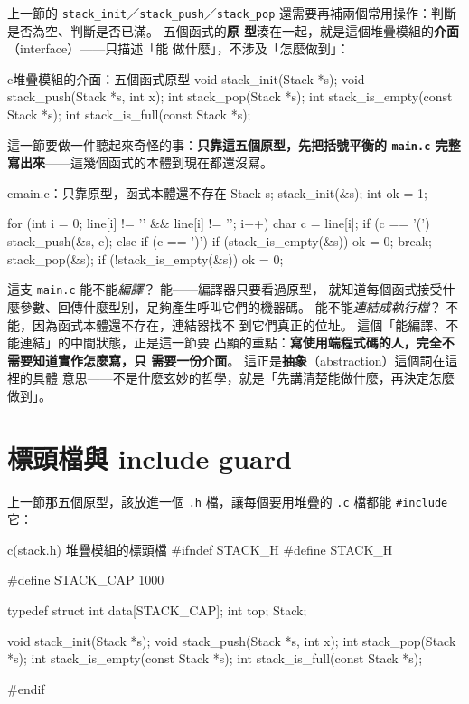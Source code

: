 上一節的 \texttt{stack\_init}／\texttt{stack\_push}／\texttt{stack\_pop}
還需要再補兩個常用操作：判斷是否為空、判斷是否已滿。 五個函式的\textbf{原
型}湊在一起，就是這個堆疊模組的\textbf{介面}（interface）——只描述「能
做什麼」，不涉及「怎麼做到」：

\begin{code}{c}{堆疊模組的介面：五個函式原型}
void stack_init(Stack *s);
void stack_push(Stack *s, int x);
int  stack_pop(Stack *s);
int  stack_is_empty(const Stack *s);
int  stack_is_full(const Stack *s);
\end{code}

這一節要做一件聽起來奇怪的事：\textbf{只靠這五個原型，先把括號平衡的
\texttt{main.c} 完整寫出來}——這幾個函式的本體到現在都還沒寫。

\begin{code}{c}{main.c：只靠原型，函式本體還不存在}
Stack s;
stack_init(&s);
int ok = 1;

for (int i = 0; line[i] != '\0' && line[i] != '\n'; i++) {
    char c = line[i];
    if (c == '(') {
        stack_push(&s, c);
    } else if (c == ')') {
        if (stack_is_empty(&s)) { ok = 0; break; }
        stack_pop(&s);
    }
}
if (!stack_is_empty(&s)) ok = 0;
\end{code}

這支 \texttt{main.c} 能不能\textit{編譯}？ 能——編譯器只要看過原型，
就知道每個函式接受什麼參數、回傳什麼型別，足夠產生呼叫它們的機器碼。
能不能\textit{連結成執行檔}？ 不能，因為函式本體還不存在，連結器找不
到它們真正的位址。 這個「能編譯、不能連結」的中間狀態，正是這一節要
凸顯的重點：\textbf{寫使用端程式碼的人，完全不需要知道實作怎麼寫，只
需要一份介面}。 這正是\textbf{抽象}（abstraction）這個詞在這裡的具體
意思——不是什麼玄妙的哲學，就是「先講清楚能做什麼，再決定怎麼做到」。


\section{標頭檔與 include guard}
\label{sec:obj-header}

上一節那五個原型，該放進一個 \texttt{.h} 檔，讓每個要用堆疊的
\texttt{.c} 檔都能 \texttt{\#include} 它：

\begin{example}{c}{(stack.h) 堆疊模組的標頭檔}
#ifndef STACK_H
#define STACK_H

#define STACK_CAP 1000

typedef struct {
    int data[STACK_CAP];
    int top;
} Stack;

void stack_init(Stack *s);
void stack_push(Stack *s, int x);
int  stack_pop(Stack *s);
int  stack_is_empty(const Stack *s);
int  stack_is_full(const Stack *s);

#endif
\end{example}

